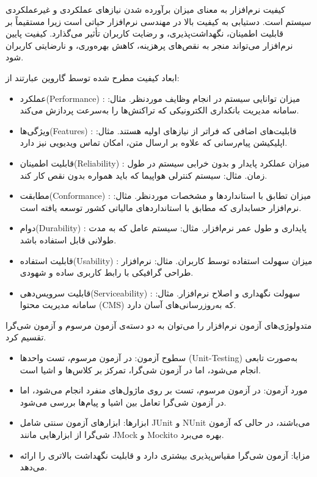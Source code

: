 کیفیت نرم‌افزار به معنای میزان برآورده شدن نیازهای عملکردی و غیرعملکردی سیستم است. دستیابی به کیفیت بالا در مهندسی نرم‌افزار حیاتی است زیرا مستقیماً بر قابلیت اطمینان، نگهداشت‌پذیری، و رضایت کاربران تأثیر می‌گذارد. کیفیت پایین نرم‌افزار می‌تواند منجر به نقص‌های پرهزینه، کاهش بهره‌وری، و نارضایتی کاربران شود.

ابعاد کیفیت مطرح شده توسط گاروین عبارتند از:

\begin{itemize}
    \item {عملکرد}(Performance) : میزان توانایی سیستم در انجام وظایف موردنظر. مثال: سامانه مدیریت بانکداری الکترونیکی که تراکنش‌ها را به‌سرعت پردازش می‌کند.
    \item {ویژگی‌ها}(Features) : قابلیت‌های اضافی که فراتر از نیازهای اولیه هستند. مثال: اپلیکیشن پیام‌رسانی که علاوه بر ارسال متن، امکان تماس ویدیویی نیز دارد.
    \item {قابلیت اطمینان}(Reliability) : میزان عملکرد پایدار و بدون خرابی سیستم در طول زمان. مثال: سیستم کنترلی هواپیما که باید همواره بدون نقص کار کند.
    \item {مطابقت}(Conformance) : میزان تطابق با استانداردها و مشخصات موردنظر. مثال: نرم‌افزار حسابداری که مطابق با استانداردهای مالیاتی کشور توسعه یافته است.
    \item {دوام}(Durability) : پایداری و طول عمر نرم‌افزار. مثال: سیستم عامل که به مدت طولانی قابل استفاده باشد.
    \item {قابلیت استفاده}(Usability) : میزان سهولت استفاده توسط کاربران. مثال: نرم‌افزار طراحی گرافیکی با رابط کاربری ساده و شهودی.
    \item {قابلیت سرویس‌دهی}(Serviceability) : سهولت نگهداری و اصلاح نرم‌افزار. مثال: سامانه مدیریت محتوا (CMS) که به‌روزرسانی‌های آسان دارد.

\end{itemize}

متدولوژی‌های آزمون نرم‌افزار را می‌توان به دو دسته‌ی آزمون مرسوم و آزمون شی‌گرا تقسیم کرد.

\begin{itemize}
    \item {سطوح آزمون}: در آزمون مرسوم، تست واحدها (Unit-Testing) به‌صورت تابعی انجام می‌شود، اما در آزمون شی‌گرا، تمرکز بر کلاس‌ها و اشیا است.
    \item {مورد آزمون}: در آزمون مرسوم، تست بر روی ماژول‌های منفرد انجام می‌شود، اما در آزمون شی‌گرا تعامل بین اشیا و پیام‌ها بررسی می‌شود.
    \item {ابزارها}: ابزارهای آزمون سنتی شامل JUnit و NUnit می‌باشند، در حالی که آزمون شی‌گرا از ابزارهایی مانند JMock و Mockito بهره می‌برد.
    \item {مزایا}: آزمون شی‌گرا مقیاس‌پذیری بیشتری دارد و قابلیت نگهداشت بالاتری را ارائه می‌دهد.
\end{itemize}

